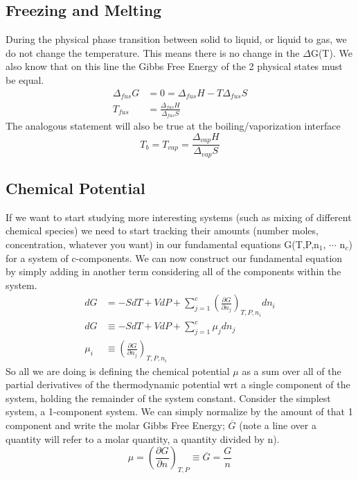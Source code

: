 \documentclass{article}
\begin{document}
\subsection*{Freezing and Melting}
During the physical phase transition between solid to liquid, or liquid to gas, we do not change the temperature.
This means there is no change in the $\Delta$G(T). 
We also know that on this line the Gibbs Free Energy of the 2 physical states must be equal. 
\begin{equation}
\begin{split}
    \Delta_{fus}G &= 0 = \Delta _{fus}H - T\Delta_{fus}S \\
    T_{fus} &= \frac{\Delta _{fus}H}{\Delta _{fus}S}
    \end{split}
\end{equation}
The analogous statement will also be true at the boiling/vaporization interface
\begin{equation}
T_b = T_{vap} = \frac{\Delta _{vap}H}{\Delta _{vap}S}
\end{equation}

\subsection*{Chemical Potential}
If we want to start studying more interesting systems (such as mixing of different chemical species) we need to start tracking their amounts (number moles, concentration, whatever you want) in our fundamental equations G(T,P,n$_1$, $\cdots$ n$_c$) for a system of c-components. 
We can now construct our fundamental equation by simply adding in another term considering all of the components within the system. 
\begin{equation}
\begin{split}
dG &= -SdT + VdP + \sum_{j=1}^{c} \left(\frac{\partial G}{\partial n_j}\right)_{T,P,n_i}dn_i \\
dG &\equiv -SdT + VdP + \sum_{j=1}^c \mu_jdn_j \\
\mu_i &\equiv \left(\frac{\partial G}{\partial n_j}\right)_{T,P,n_i}
\end{split}
\end{equation}
So all we are doing is defining the chemical potential $\mu$ as a sum over all of the partial derivatives of the thermodynamic potential wrt a single component of the system, holding the remainder of the system constant. 
 Consider the simplest system, a 1-component system.
 We can simply normalize by the amount of that 1 component and write the molar Gibbs Free Energy; $\overline{G}$ (note a line over a quantity will refer to a molar quantity, a quantity divided by n).
 \begin{equation}
 \mu = \left(\frac{\partial G}{\partial n}\right)_{T,P} \equiv \overline{G} = \frac{G}{n}
 \end{equation}
\end{document}
